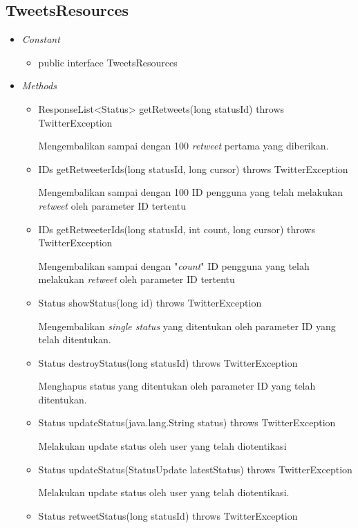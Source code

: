	\subsection{TweetsResources}
	\begin{itemize}
		\item \textit{Constant}
		
			\begin{itemize}
				\item public interface TweetsResources
			\end{itemize}
		\item \textit{Methods}
		
		\begin{itemize}
			\item ResponseList<Status> getRetweets(long statusId) throws TwitterException
			
			Mengembalikan sampai dengan 100 \textit{retweet} pertama yang diberikan.
			\item IDs getRetweeterIds(long statusId, long cursor) throws TwitterException
			
			Mengembalikan sampai dengan 100 ID pengguna yang telah melakukan \textit{retweet} oleh parameter ID tertentu
			\item IDs getRetweeterIds(long statusId, int count, long cursor) throws TwitterException
			
			Mengembalikan sampai dengan "\textit{count}" ID pengguna yang telah melakukan \textit{retweet} oleh parameter ID tertentu
			\item Status showStatus(long id) throws TwitterException
			
			Mengembalikan \textit{single status} yang ditentukan oleh parameter ID yang telah ditentukan.
			\item Status destroyStatus(long statusId) throws TwitterException
			
			Menghapus status yang ditentukan oleh parameter ID yang telah ditentukan.
			\item Status updateStatus(java.lang.String status) throws TwitterException
			
			Melakukan update status oleh user yang telah diotentikasi
			\item Status updateStatus(StatusUpdate latestStatus) throws TwitterException
			
			Melakukan update status oleh user yang telah diotentikasi.
			\item Status retweetStatus(long statusId) throws TwitterException
			

\end{itemize}
\end{itemize}
